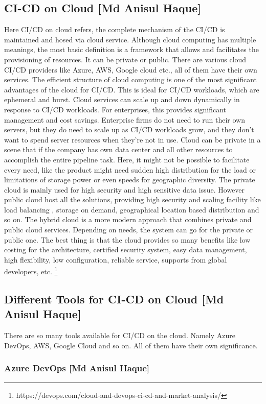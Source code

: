 %
\subsection{CI-CD on Cloud [Md Anisul Haque]}
%
Here CI/CD on cloud refers, the complete mechanism of the CI/CD is maintained and hosed via cloud service. Although cloud computing has multiple meanings, the most basic definition is a framework that allows and facilitates the provisioning of resources. It can be private or public. There are various cloud CI/CD providers like Azure, AWS, Google cloud etc., all of them have their own services\cite{inproceedings}. The efficient structure of cloud computing is one of the most significant advantages of the cloud for CI/CD. This is ideal for CI/CD workloads, which are ephemeral and burst. Cloud services can scale up and down dynamically in response to CI/CD workloads. For enterprises, this provides significant management and cost savings. Enterprise firms do not need to run their own servers, but they do need to scale up as CI/CD workloads grow, and they don't want to spend server resources when they're not in use. Cloud can be private in a scene that if the company has own data center and all other resources to accomplish the entire pipeline task. Here, it might not be possible to facilitate every need, like the product might need sudden high distribution for the load or limitations of storage power or even speeds for geographic diversity. The private cloud is mainly used for high security and high sensitive data issue. However public cloud host all the solutions, providing high security and scaling facility like load balancing , storage on demand, geographical location based distribution and so on. The hybrid cloud is a more modern approach that combines private and public cloud services. Depending on needs, the system can go for the private or public one. The best thing is that the cloud provides so many benefits like low costing for the architecture, certified security system, easy data management, high flexibility, low configuration, reliable service, supports from global developers, etc. 
\footnote{https://devops.com/cloud-and-devops-ci-cd-and-market-analysis/}
%
\subsection{Different Tools for CI-CD on Cloud [Md Anisul Haque]}
%
There are so many tools available for CI/CD on the cloud. Namely Azure DevOps, AWS, Google Cloud and so on. All of them have their own significance. 
%
\subsubsection{Azure DevOps [Md Anisul Haque]}
%

